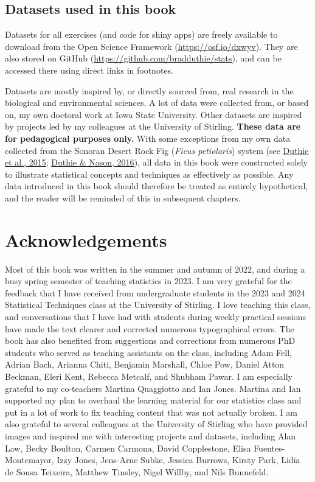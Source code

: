 \documentclass[
  openany]{krantz}
\begin{document}
\hypertarget{datasets}{%
\section*{Datasets used in this book}\label{datasets}}


Datasets for all exercises (and code for shiny apps) are freely available to download from the Open Science Framework (\url{https://osf.io/dxwyv}).
They are also stored on GitHub (\url{https://github.com/bradduthie/stats}), and can be accessed there using direct links in footnotes.

Datasets are mostly inspired by, or directly sourced from, real research in the biological and environmental sciences.
A lot of data were collected from, or based on, my own doctoral work at Iowa State University.
Other datasets are inspired by projects led by my colleagues at the University of Stirling.
\textbf{These data are for pedagogical purposes only.}
With some exceptions from my own data collected from the Sonoran Desert Rock Fig (\emph{Ficus petiolaris}) system (see \protect\hyperlink{ref-Duthie2015b}{Duthie et al., 2015}; \protect\hyperlink{ref-Duthie2016}{Duthie \& Nason, 2016}), all data in this book were constructed solely to illustrate statistical concepts and techniques as effectively as possible.
Any data introduced in this book should therefore be treated as entirely hypothetical, and the reader will be reminded of this in subsequent chapters.

\clearpage

\hypertarget{acknowledgements}{%
\chapter*{Acknowledgements}\label{acknowledgements}}


Most of this book was written in the summer and autumn of 2022, and during a busy spring semester of teaching statistics in 2023.
I am very grateful for the feedback that I have received from undergraduate students in the 2023 and 2024 Statistical Techniques class at the University of Stirling.
I love teaching this class, and conversations that I have had with students during weekly practical sessions have made the text clearer and corrected numerous typographical errors.
The book has also benefited from suggestions and corrections from numerous PhD students who served as teaching assistants on the class, including Adam Fell, Adrian Bach, Arianna Chiti, Benjamin Marshall, Chloe Pow, Daniel Atton Beckman, Eleri Kent, Rebecca Metcalf, and Shubham Pawar.
I am especially grateful to my co-teachers Martina Quaggiotto and Ian Jones.
Martina and Ian supported my plan to overhaul the learning material for our statistics class and put in a lot of work to fix teaching content that was not actually broken.
I am also grateful to several colleagues at the University of Stirling who have provided images and inspired me with interesting projects and datasets, including Alan Law, Becky Boulton, Carmen Carmona, David Copplestone, Elisa Fuentes-Montemayor, Izzy Jones, Jens-Arne Subke, Jessica Burrows, Kirsty Park, Lidia de Sousa Teixeira, Matthew Tinsley, Nigel Willby, and Nils Bunnefeld.
\end{document}
